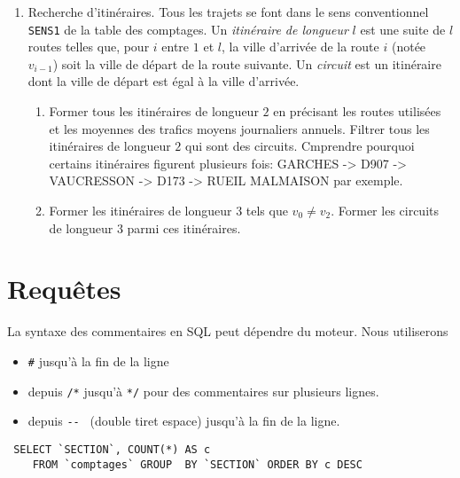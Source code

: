 \begin{enumerate}
  \item Recherche d'itinéraires. Tous les trajets se font dans le sens conventionnel \verb|SENS1| de la table des comptages. Un \emph{itinéraire de longueur} $l$ est une suite de $l$ routes telles que, pour $i$ entre $1$ et $l$, la ville d'arrivée de la route $i$ (notée $v_{i-1}$) soit la ville de départ de la route suivante. Un \emph{circuit} est un itinéraire dont la ville de départ est égal à la ville d'arrivée.
  \begin{enumerate}
    \item Former tous les itinéraires de longueur $2$ en précisant les routes utilisées et les moyennes des trafics moyens journaliers annuels. Filtrer tous les itinéraires de longueur $2$ qui sont des circuits. Cmprendre pourquoi certains itinéraires figurent plusieurs fois: GARCHES -> D907 -> VAUCRESSON -> D173 -> RUEIL MALMAISON par exemple.
    \item Former les itinéraires de longueur $3$ tels que $v_0 \neq v_2$. Former les circuits de longueur $3$ parmi ces itinéraires.
  \end{enumerate}
  
\end{enumerate}


\section{Requêtes}
La syntaxe des commentaires en SQL peut dépendre du moteur. Nous utiliserons
\begin{itemize}
  \item \verb|#| jusqu'à la fin de la ligne
  \item depuis \verb|/*| jusqu'à \verb|*/| pour des commentaires sur plusieurs lignes.
  \item depuis \verb|-- | (double tiret espace) jusqu'à la fin de la ligne.
\end{itemize}
\begin{verbatim}
 SELECT `SECTION`, COUNT(*) AS c  
    FROM `comptages` GROUP  BY `SECTION` ORDER BY c DESC
\end{verbatim}

